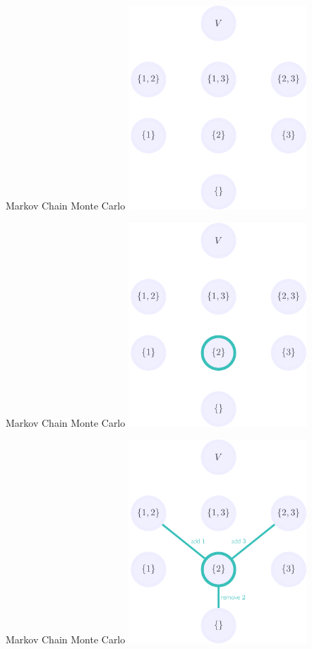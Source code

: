 \documentclass[mathserif]{beamer}
\begin{document}
\begin{frame}{Markov Chain Monte Carlo}
\vspace{0.5em}
\centering
\includegraphics[height=3in]{figures/lattice_nodes_only.pdf}
\end{frame}

\begin{frame}{Markov Chain Monte Carlo}
\vspace{0.5em}
\centering
\includegraphics[height=3in]{figures/lattice_example_node.pdf}
\end{frame}

\begin{frame}{Markov Chain Monte Carlo}
\vspace{0.5em}
\centering
\includegraphics[height=3in]{figures/lattice_example_edges.pdf}
\end{frame}
\end{document}
